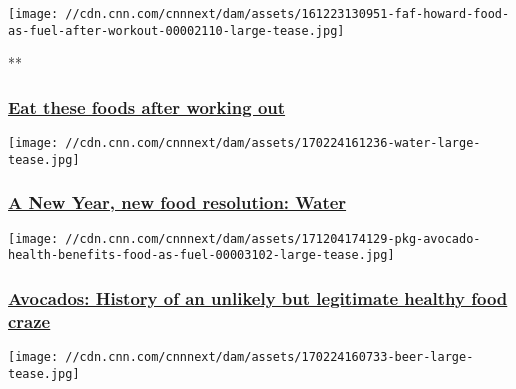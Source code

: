 \href{/videos/tv/2016/12/23/faf-howard-food-as-fuel-after-workout.cnn}{}

\texttt{[image: //cdn.cnn.com/cnnnext/dam/assets/161223130951-faf-howard-food-as-fuel-after-workout-00002110-large-tease.jpg]}

**

\hypertarget{eat-these-foods-after-working-out}{%
\subsubsection{\texorpdfstring{\href{/videos/tv/2016/12/23/faf-howard-food-as-fuel-after-workout.cnn}{Eat
these foods after working
out}}{Eat these foods after working out}}\label{eat-these-foods-after-working-out}}

\href{/2017/12/25/health/water-food-resolution-drayer/index.html}{}

\texttt{[image: //cdn.cnn.com/cnnnext/dam/assets/170224161236-water-large-tease.jpg]}

\hypertarget{a-new-year-new-food-resolution-water}{%
\subsubsection{\texorpdfstring{\href{/2017/12/25/health/water-food-resolution-drayer/index.html}{A
New Year, new food resolution:
Water}}{A New Year, new food resolution: Water}}\label{a-new-year-new-food-resolution-water}}

\href{/2017/12/08/health/avocados-health-benefits-food-as-fuel-explainer/index.html}{}

\texttt{[image: //cdn.cnn.com/cnnnext/dam/assets/171204174129-pkg-avocado-health-benefits-food-as-fuel-00003102-large-tease.jpg]}

\hypertarget{avocados-history-of-an-unlikely-but-legitimate-healthy-food-craze}{%
\subsubsection{\texorpdfstring{\href{/2017/12/08/health/avocados-health-benefits-food-as-fuel-explainer/index.html}{Avocados:
History of an unlikely but legitimate healthy food
craze}}{Avocados: History of an unlikely but legitimate healthy food craze}}\label{avocados-history-of-an-unlikely-but-legitimate-healthy-food-craze}}

\href{/2017/03/16/health/hangover-cure-foods-explainer/index.html}{}

\texttt{[image: //cdn.cnn.com/cnnnext/dam/assets/170224160733-beer-large-tease.jpg]}

